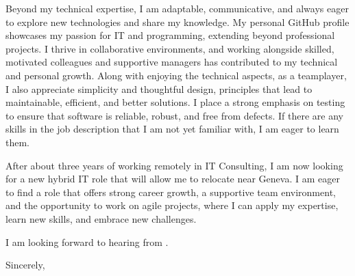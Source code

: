 \documentclass[10pt, a4paper]{article}
\begin{document}
Beyond my technical expertise, I am adaptable, communicative, and always eager to explore new technologies and share my knowledge. My personal GitHub profile showcases my passion for IT and programming, extending beyond professional projects. I thrive in collaborative environments, and working alongside skilled, motivated colleagues and supportive managers has contributed to my technical and personal growth. Along with enjoying the technical aspects, as a teamplayer, I also appreciate simplicity and thoughtful design, principles that lead to maintainable, efficient, and better solutions. I place a strong emphasis on testing to ensure that software is reliable, robust, and free from defects. If there are any skills in the job description that I am not yet familiar with, I am eager to learn them.

After about three years of working remotely in IT Consulting, I am now looking for a new hybrid IT role that will allow me to relocate near Geneva. I am eager to find a role that offers strong career growth, a supportive team environment, and the opportunity to work on agile projects, where I can apply my expertise, learn new skills, and embrace new challenges.

I am looking forward to hearing from \COMPANY. 

\bigskip

Sincerely,

\vspace{20pt}

\name
\end{document}
